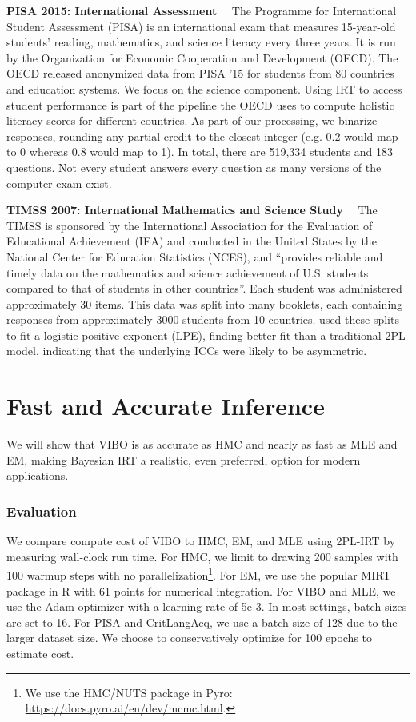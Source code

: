 \noindent\textbf{PISA 2015: International Assessment}$\quad$
The Programme for International Student Assessment (PISA) is an international exam that measures 15-year-old students' reading, mathematics, and science literacy every three years.
It is run by the Organization for Economic Cooperation and Development (OECD).
The OECD released anonymized data from PISA '15 for students from 80 countries and education systems.
We focus on the science component.
Using IRT to access student performance is part of the pipeline the OECD uses to compute holistic literacy scores for different countries.
As part of our processing, we binarize responses, rounding any partial credit to the closest integer (e.g. 0.2 would map to 0 whereas 0.8 would map to 1).
In total, there are 519,334 students and 183 questions.
Not every student answers every question as many versions of the computer exam exist.\newline

\noindent\textbf{TIMSS 2007: International Mathematics and Science Study}$\quad$
The TIMSS is sponsored by the International Association for the Evaluation of Educational Achievement (IEA) and conducted in the United States by the National
Center for Education Statistics (NCES), and ``provides reliable and timely data on the mathematics and science achievement of U.S. students compared to that of students in other countries''.
Each student was administered approximately 30 items. This data was split into many booklets, each containing responses from approximately 3000 students from 10 countries. \cite{lee2018asymmetric} used these splits to fit a logistic positive exponent (LPE), finding better fit than a traditional 2PL model, indicating that the underlying ICCs were likely to be asymmetric.

\section{Fast and Accurate Inference}
\label{sec:inferenceexpts}
We will show that VIBO is as accurate as HMC and nearly as fast as MLE and EM, making Bayesian IRT a realistic, even preferred, option for modern applications.

\subsubsection{Evaluation}
We compare compute cost of VIBO to HMC, EM, and MLE using 2PL-IRT by measuring wall-clock run time.
For HMC, we limit to drawing 200 samples with 100 warmup steps with no parallelization\footnote{We use the HMC/NUTS package in Pyro: \url{https://docs.pyro.ai/en/dev/mcmc.html}.}.
For EM, we use the popular MIRT package in R with 61 points for numerical integration.
For VIBO and MLE, we use the Adam optimizer with a learning rate of 5e-3. In most settings, batch sizes are set to 16. For PISA and CritLangAcq, we use a batch size of 128 due to the larger dataset size. We choose to conservatively optimize for 100 epochs to estimate cost.

